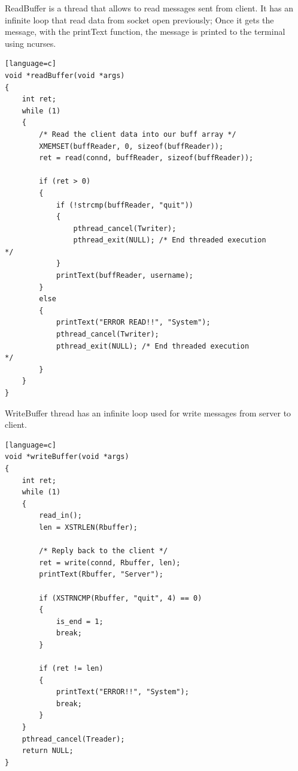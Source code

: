\documentclass[a4paper,12pt]{report}
\begin{document}
ReadBuffer is a thread that allows to read messages sent from client. It has an infinite loop that read data from socket open previously; Once it gets the message, with the printText function, the message is printed to the terminal using ncurses. 
\begin{lstlisting}[caption={readBuffer thread of TCP server},captionpos=b][language=c]
void *readBuffer(void *args)
{
    int ret;
    while (1)
    {
        /* Read the client data into our buff array */
        XMEMSET(buffReader, 0, sizeof(buffReader));
        ret = read(connd, buffReader, sizeof(buffReader));

        if (ret > 0)
        {
            if (!strcmp(buffReader, "quit"))
            {
                pthread_cancel(Twriter);
                pthread_exit(NULL); /* End threaded execution                */
            }
            printText(buffReader, username);
        }
        else
        {
            printText("ERROR READ!!", "System");
            pthread_cancel(Twriter);
            pthread_exit(NULL); /* End threaded execution                */
        }
    }
}

\end{lstlisting}
WriteBuffer thread has an infinite loop used for write messages from server to client.
\begin{lstlisting}[caption={writeBuffer thread of TCP server},captionpos=b][language=c]
void *writeBuffer(void *args)
{
    int ret;
    while (1)
    {
        read_in();
        len = XSTRLEN(Rbuffer);

        /* Reply back to the client */
        ret = write(connd, Rbuffer, len);
        printText(Rbuffer, "Server");

        if (XSTRNCMP(Rbuffer, "quit", 4) == 0)
        {
            is_end = 1;
            break;
        }

        if (ret != len)
        {
            printText("ERROR!!", "System");
            break;
        }
    }
    pthread_cancel(Treader);
    return NULL;
}

\end{lstlisting}
\pagebreak
\end{document}
